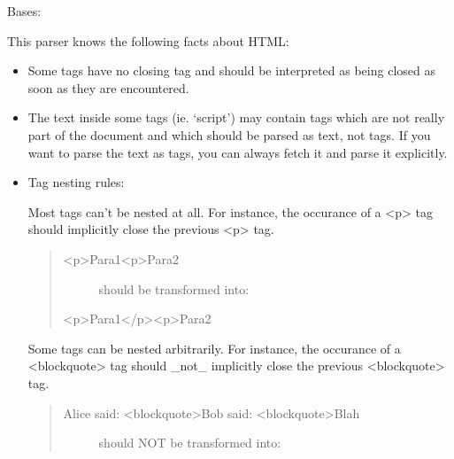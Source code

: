 \documentclass[letterpaper,10pt,english]{sphinxmanual}
\begin{document}

\begin{fulllineitems}
\label{SamPy.parsing:SamPy.parsing.BeautifulSoup.BeautifulSoup}
Bases: {\hyperref[SamPy.parsing:SamPy.parsing.BeautifulSoup.BeautifulStoneSoup]{}}

This parser knows the following facts about HTML:
\begin{itemize}
\item {} 
Some tags have no closing tag and should be interpreted as being
closed as soon as they are encountered.

\item {} 
The text inside some tags (ie. `script') may contain tags which
are not really part of the document and which should be parsed
as text, not tags. If you want to parse the text as tags, you can
always fetch it and parse it explicitly.

\item {} 
Tag nesting rules:

Most tags can't be nested at all. For instance, the occurance of
a \textless{}p\textgreater{} tag should implicitly close the previous \textless{}p\textgreater{} tag.
\begin{quote}
\begin{description}
\item[{\textless{}p\textgreater{}Para1\textless{}p\textgreater{}Para2}] \leavevmode
should be transformed into:

\end{description}

\textless{}p\textgreater{}Para1\textless{}/p\textgreater{}\textless{}p\textgreater{}Para2
\end{quote}

Some tags can be nested arbitrarily. For instance, the occurance
of a \textless{}blockquote\textgreater{} tag should \_not\_ implicitly close the previous
\textless{}blockquote\textgreater{} tag.
\begin{quote}
\begin{description}
\item[{Alice said: \textless{}blockquote\textgreater{}Bob said: \textless{}blockquote\textgreater{}Blah}] \leavevmode
should NOT be transformed into:

\end{description}


\end{quote}
\end{itemize}
\end{fulllineitems}
\end{document}
